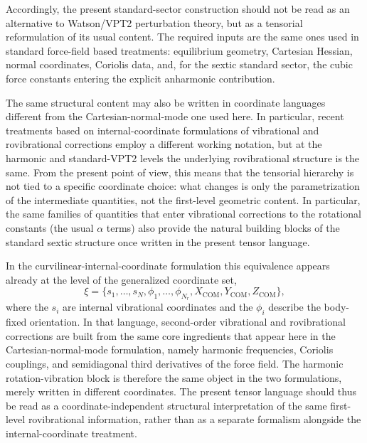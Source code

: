 \documentclass[aip,jcp,reprint,floatfix]{revtex4-2}
\begin{document}
Accordingly, the present standard-sector construction should not be
read as an alternative to Watson/VPT2 perturbation theory, but as a
tensorial reformulation of its usual content. The required inputs are
the same ones used in standard force-field based treatments:
equilibrium geometry, Cartesian Hessian, normal coordinates, Coriolis
data, and, for the sextic standard sector, the cubic force constants
entering the explicit anharmonic contribution.

The same structural content may also be written in coordinate
languages different from the Cartesian-normal-mode one used here. In
particular, recent treatments based on internal-coordinate
formulations of vibrational and rovibrational corrections employ a
different working notation, but at the harmonic and standard-VPT2
levels the underlying rovibrational structure is the same.\cite{cubic-internal_2024}
From the present point of view, this means that the tensorial
hierarchy is not tied to a specific coordinate choice: what changes is
only the parametrization of the intermediate quantities, not the
first-level geometric content. In particular, the same families of
quantities that enter vibrational corrections to the rotational
constants (the usual $\alpha$ terms) also provide the natural building
blocks of the standard sextic structure once written in the present
tensor language.

In the curvilinear-internal-coordinate formulation this equivalence
appears already at the level of the generalized coordinate set,
\begin{equation}
\xi = \{s_1,\ldots,s_N,\phi_1,\ldots,\phi_{N_r},
X_{\mathrm{COM}},Y_{\mathrm{COM}},Z_{\mathrm{COM}}\},
\end{equation}
where the $s_i$ are internal vibrational coordinates and the $\phi_i$
describe the body-fixed orientation.\cite{cubic-internal_2024} In
that language, second-order vibrational and rovibrational corrections
are built from the same core ingredients that appear here in the
Cartesian-normal-mode formulation, namely harmonic frequencies,
Coriolis couplings, and semidiagonal third derivatives of the force
field. The harmonic rotation-vibration block is therefore the same
object in the two formulations, merely written in different
coordinates. The present tensor language should thus be read as a
coordinate-independent structural interpretation of the same
first-level rovibrational information, rather than as a separate
formalism alongside the internal-coordinate treatment.
\end{document}

